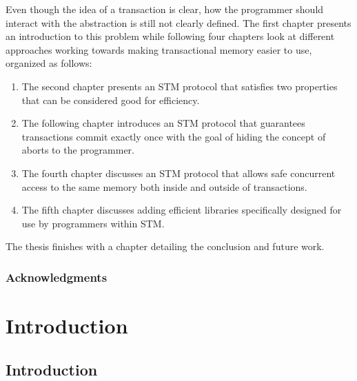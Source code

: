 \documentclass[11pt]{book}
\begin{document}
Even though the idea of a transaction is clear, how the programmer should interact with the
abstraction is still not clearly defined.
The first chapter presents an introduction to this problem
while following four chapters look at different approaches working towards
making transactional memory easier to use, organized as follows:
\begin{enumerate}
\item The second chapter presents an STM protocol that satisfies two properties that can be considered good for efficiency.
\item The following chapter introduces an STM protocol that guarantees transactions commit exactly once with the goal of hiding the concept of aborts to the programmer.
\item The fourth chapter discusses an STM protocol that allows safe concurrent access to the same memory both inside and outside of transactions.
\item The fifth chapter discusses adding efficient libraries specifically designed for use by
programmers within STM.
\end{enumerate}
The thesis finishes with a chapter detailing the conclusion and future work.



\newpage

\section*{Acknowledgments}
%

\sloppy

\tableofcontents      	%
\listoffigures        	%
\clearpage




\part{Introduction}

\chapter*{Introduction}
%
%

\end{document}
